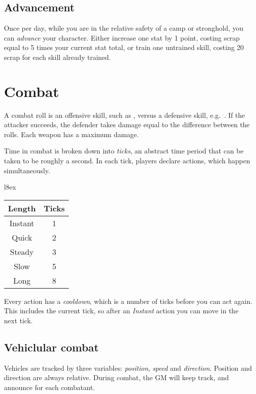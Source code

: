\documentclass[10pt, a4paper, twocolumn]{article}
\begin{document}
\subsection{Advancement}
Once per day, while you are in the relative safety of a camp or stronghold, you can \emph{advance} your character. Either increase one stat by 1 point, costing scrap equal to 5 times your current stat total, or train one untrained skill, costing 20 scrap for each skill already trained.

\section{Combat}
A combat roll is an offensive skill, such as , versus a defensive skill, e.g.\ . If the attacker succeeds, the defender takes damage equal to the difference between the rolls. Each weapon has a maximum damage.

Time in combat is broken down into \emph{ticks}, an abstract time period that can be taken to be roughly a second. In each tick, players declare actions, which happen simultaneously.

\begin{wraptable}[5]{l}{8ex}
  \small
\vspace*{-4ex}
\hspace*{-4ex}
\begin{tabular}{cc}
  Length   & Ticks \\
  \hline
  Instant  & 1     \\
  Quick    & 2     \\
  Steady   & 3     \\
  Slow     & 5     \\
  Long     & 8
\end{tabular}
\end{wraptable}

Every action has a \emph{cooldown}, which is a number of ticks before you can act again. This includes the current tick, so after an \emph{Instant} action you can move in the next tick.

\subsection{Vehiclular combat}
Vehicles are tracked  by three variables: \emph{position}, \emph{speed} and \emph{direction}. Position and direction are always relative. During combat, the GM will keep track, and announce for each combatant.
\end{document}

